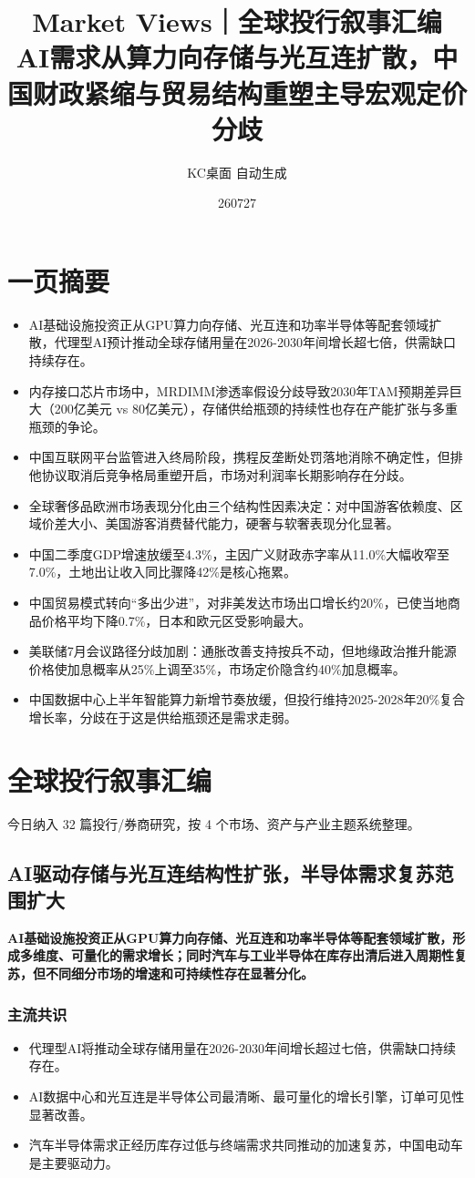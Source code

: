 \documentclass[11pt]{ctexart}
\title{\textbf{Market Views｜全球投行叙事汇编}\\[0.4em]{\large AI需求从算力向存储与光互连扩散，中国财政紧缩与贸易结构重塑主导宏观定价分歧}}
\author{KC桌面 自动生成}
\date{260727}
\begin{document}
\maketitle
\tableofcontents
\newpage
\section{一页摘要}
\begin{itemize}
  \item AI基础设施投资正从GPU算力向存储、光互连和功率半导体等配套领域扩散，代理型AI预计推动全球存储用量在2026-2030年间增长超七倍，供需缺口持续存在。
  \item 内存接口芯片市场中，MRDIMM渗透率假设分歧导致2030年TAM预期差异巨大（200亿美元 vs 80亿美元），存储供给瓶颈的持续性也存在产能扩张与多重瓶颈的争论。
  \item 中国互联网平台监管进入终局阶段，携程反垄断处罚落地消除不确定性，但排他协议取消后竞争格局重塑开启，市场对利润率长期影响存在分歧。
  \item 全球奢侈品欧洲市场表现分化由三个结构性因素决定：对中国游客依赖度、区域价差大小、美国游客消费替代能力，硬奢与软奢表现分化显著。
  \item 中国二季度GDP增速放缓至4.3\%，主因广义财政赤字率从11.0\%大幅收窄至7.0\%，土地出让收入同比骤降42\%是核心拖累。
  \item 中国贸易模式转向“多出少进”，对非美发达市场出口增长约20\%，已使当地商品价格平均下降0.7\%，日本和欧元区受影响最大。
  \item 美联储7月会议路径分歧加剧：通胀改善支持按兵不动，但地缘政治推升能源价格使加息概率从25\%上调至35\%，市场定价隐含约40\%加息概率。
  \item 中国数据中心上半年智能算力新增节奏放缓，但投行维持2025-2028年20\%复合增长率，分歧在于这是供给瓶颈还是需求走弱。
\end{itemize}
\section{全球投行叙事汇编}
今日纳入 32 篇投行/券商研究，按 4 个市场、资产与产业主题系统整理。
\newpage
\subsection{AI驱动存储与光互连结构性扩张，半导体需求复苏范围扩大}
\textbf{AI基础设施投资正从GPU算力向存储、光互连和功率半导体等配套领域扩散，形成多维度、可量化的需求增长；同时汽车与工业半导体在库存出清后进入周期性复苏，但不同细分市场的增速和可持续性存在显著分化。}
\subsubsection*{主流共识}
\begin{itemize}
  \item 代理型AI将推动全球存储用量在2026-2030年间增长超过七倍，供需缺口持续存在。
  \item AI数据中心和光互连是半导体公司最清晰、最可量化的增长引擎，订单可见性显著改善。
  \item 汽车半导体需求正经历库存过低与终端需求共同推动的加速复苏，中国电动车是主要驱动力。
\end{itemize}
\end{document}
